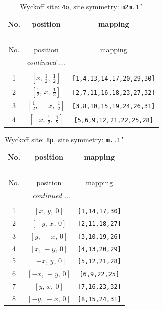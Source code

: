 \documentclass[fleqn,8pt]{jsarticle}
\begin{document}
\renewcommand{\arraystretch}{1.2}
\begin{longtable}{ccc}
\caption{Wyckoff site: {\tt 4o}, site symmetry: {\tt m2m.1'}}
 \\
 \hline \hline
No. & position & mapping \\ \hline \endfirsthead

\multicolumn{2}{l}{\tablename\ \thetable{}} \\
 \hline \hline
No. & position & mapping \\ \hline \endhead

 \hline \hline
\multicolumn{2}{r}{\footnotesize\it continued ...} \\ \endfoot

 \hline \hline
\multicolumn{2}{r}{} \\ \endlastfoot

1 & $\left[ x,\, \frac{1}{2},\, \frac{1}{2} \right]$ & {\tt [1,4,13,14,17,20,29,30]} \\ \hline
2 & $\left[ \frac{1}{2},\, x,\, \frac{1}{2} \right]$ & {\tt [2,7,11,16,18,23,27,32]} \\ \hline
3 & $\left[ \frac{1}{2},\, - x,\, \frac{1}{2} \right]$ & {\tt [3,8,10,15,19,24,26,31]} \\ \hline
4 & $\left[ - x,\, \frac{1}{2},\, \frac{1}{2} \right]$ & {\tt [5,6,9,12,21,22,25,28]} \\
\end{longtable}
\renewcommand{\arraystretch}{1.2}
\begin{longtable}{ccc}
\caption{Wyckoff site: {\tt 8p}, site symmetry: {\tt m..1'}}
 \\
 \hline \hline
No. & position & mapping \\ \hline \endfirsthead

\multicolumn{2}{l}{\tablename\ \thetable{}} \\
 \hline \hline
No. & position & mapping \\ \hline \endhead

 \hline \hline
\multicolumn{2}{r}{\footnotesize\it continued ...} \\ \endfoot

 \hline \hline
\multicolumn{2}{r}{} \\ \endlastfoot

1 & $\left[ x,\, y,\, 0 \right]$ & {\tt [1,14,17,30]} \\ \hline
2 & $\left[ - y,\, x,\, 0 \right]$ & {\tt [2,11,18,27]} \\ \hline
3 & $\left[ y,\, - x,\, 0 \right]$ & {\tt [3,10,19,26]} \\ \hline
4 & $\left[ x,\, - y,\, 0 \right]$ & {\tt [4,13,20,29]} \\ \hline
5 & $\left[ - x,\, y,\, 0 \right]$ & {\tt [5,12,21,28]} \\ \hline
6 & $\left[ - x,\, - y,\, 0 \right]$ & {\tt [6,9,22,25]} \\ \hline
7 & $\left[ y,\, x,\, 0 \right]$ & {\tt [7,16,23,32]} \\ \hline
8 & $\left[ - y,\, - x,\, 0 \right]$ & {\tt [8,15,24,31]} \\
\end{longtable}
\end{document}
